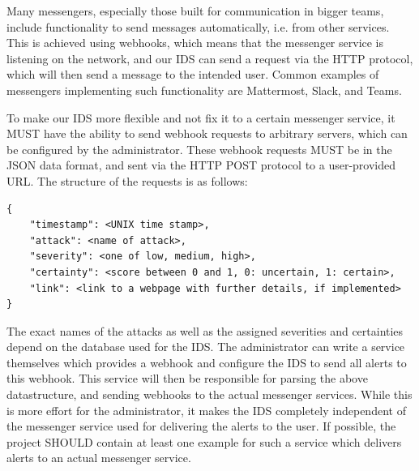 \documentclass[oneside, english]{reports/assets/sdqtechreport}
\begin{document}
Many messengers, especially those built for communication in bigger teams,
include functionality to send messages automatically, i.e. from other services.
This is achieved using webhooks, which means that the messenger service is
listening on the network, and our IDS can send a request via the HTTP
protocol, which will then send a message to the intended user. Common examples
of messengers implementing such functionality are Mattermost, Slack, and Teams.

To make our IDS more flexible and not fix it to a certain messenger service, it
MUST have the ability to send webhook requests to arbitrary servers, which can
be configured by the administrator. These webhook requests MUST be in the JSON
data format, and sent via the HTTP POST protocol to a user-provided URL. The
structure of the requests is as follows:

\begin{verbatim}
{
	"timestamp": <UNIX time stamp>,
	"attack": <name of attack>,
	"severity": <one of low, medium, high>,
	"certainty": <score between 0 and 1, 0: uncertain, 1: certain>,
	"link": <link to a webpage with further details, if implemented>
}
\end{verbatim}

The exact names of the attacks as well as the assigned severities and
certainties depend on the database used for the IDS. The administrator can
write a service themselves which provides a webhook and configure the IDS to
send all alerts to this webhook. This service will then be responsible for
parsing the above datastructure, and sending webhooks to the actual messenger
services. While this is more effort for the administrator, it makes the IDS
completely independent of the messenger service used for delivering the alerts
to the user. If possible, the project SHOULD contain at least one example for
such a service which delivers alerts to an actual messenger service.
\end{document}
